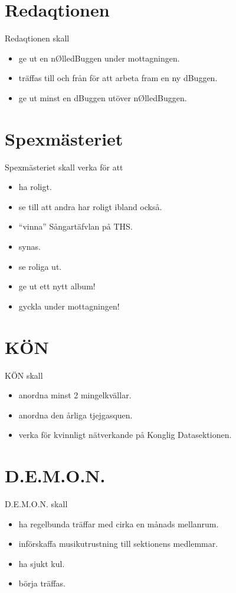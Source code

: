 \documentclass{dgovdoc}
\begin{document}
\section{Redaqtionen}

Redaqtionen skall

\begin{itemize}
\item ge ut en nØlledBuggen under mottagningen.
\item träffas till och från för att arbeta fram en ny dBuggen.
\item ge ut minst en dBuggen utöver nØlledBuggen.
\end{itemize}

\section{Spexmästeriet}

Spexmästeriet skall verka för att

\begin{itemize}
\item ha roligt.
\item se till att andra har roligt ibland också.
\item ``vinna'' Sångartäfvlan på THS.
\item synas.
\item se roliga ut.
\item ge ut ett nytt album!
\item gyckla under mottagningen!
\end{itemize}

\section{KÖN}

KÖN skall

\begin{itemize}
\item anordna minst 2 mingelkvällar.
\item anordna den årliga tjejgasquen.
\item verka för kvinnligt nätverkande på Konglig Datasektionen.
\end{itemize}

\section{D.E.M.O.N.}

D.E.M.O.N. skall

\begin{itemize}
\item ha regelbunda träffar med cirka en månads mellanrum.
\item införskaffa musikutrustning till sektionens medlemmar.
\item ha sjukt kul.
\item börja träffas.
\end{itemize}
\end{document}
